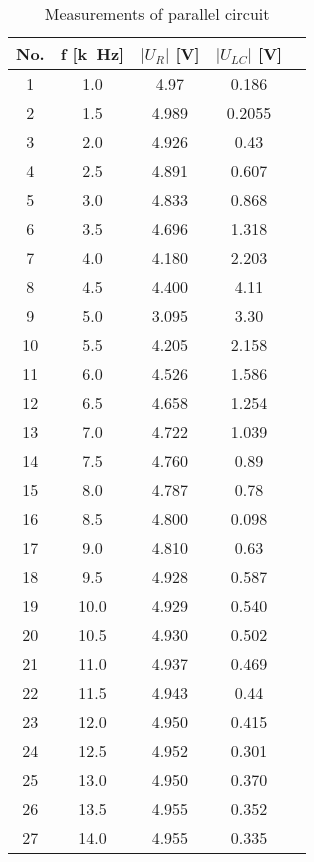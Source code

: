 \begin{table}[hptb]
	\centering
	\caption{Measurements of parallel circuit}
	\label{tab:tab1}
	\begin{tabular}{|c|c|c|c|c|}
		\hline
		No. & f [\unit{k\hertz}] & $|U_R|$ [\unit{\volt}] & $|U_{LC}|$ [\unit{\volt}]\\   
		\hline
		1& 1.0 & 4.97 & 0.186\\
		\hline
		2& 1.5 & 4.989 & 0.2055\\
		\hline
		3& 2.0 & 4.926 & 0.43\\
		\hline
		4& 2.5 & 4.891 & 0.607\\
		\hline
        5& 3.0 & 4.833 & 0.868\\
		\hline
        6& 3.5 & 4.696 & 1.318\\
		\hline
        7& 4.0 & 4.180 & 2.203\\
		\hline
        8& 4.5 & 4.400 & 4.11\\
		\hline
        9& 5.0 & 3.095 & 3.30\\
		\hline
        10& 5.5 & 4.205 & 2.158\\
		\hline
        11& 6.0 & 4.526 & 1.586\\
		\hline
        12& 6.5 & 4.658 & 1.254\\
		\hline
        13& 7.0 & 4.722 & 1.039\\
		\hline
        14& 7.5 & 4.760 & 0.89\\
		\hline
        15& 8.0 & 4.787 & 0.78\\
		\hline
        16& 8.5 & 4.800 & 0.098\\
		\hline
        17& 9.0 & 4.810 & 0.63\\
		\hline
        18& 9.5 & 4.928 & 0.587\\
		\hline
        19& 10.0 & 4.929 & 0.540\\
		\hline
        20& 10.5 & 4.930 & 0.502\\
		\hline
        21& 11.0 & 4.937 & 0.469\\
		\hline
        22& 11.5 & 4.943 & 0.44\\
		\hline
        23& 12.0 & 4.950 & 0.415\\
		\hline
        24& 12.5 & 4.952 & 0.301\\
		\hline
        25& 13.0 & 4.950 & 0.370\\
		\hline
        26& 13.5 & 4.955 & 0.352\\
		\hline
        27& 14.0 & 4.955 & 0.335\\
		\hline
	\end{tabular}
\end{table}